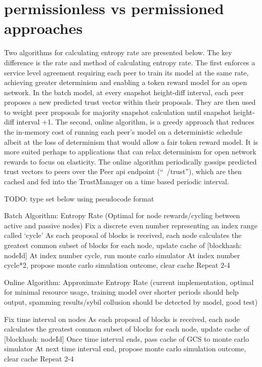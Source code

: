 \documentclass{article}
\begin{document}
\section {permissionless vs permissioned approaches}
Two algorithms for calculating entropy rate are presented below. The key difference is the rate and method of calculating entropy rate. The first enforces a service level agreement requiring each peer to train its model at the same rate, achieving greater determinism and enabling a token reward model for an open network. In the batch model, at every snapshot height-diff interval, each peer proposes a new predicted trust vector within their proposals. They are then used to weight peer proposals for majority snapshot calculation until snapshot height-diff interval +1.
The second, online algorithm, is a greedy approach that reduces the in-memory cost of running each peer’s model on a deterministic schedule albeit at the loss of determinism that would allow a fair token reward model. It is more suited perhaps to applications that can relax determinism for  open network rewards to focus on elasticity. The online algorithm periodically gossips predicted trust vectors to peers over the Peer api endpoint (“~/trust”), which are then cached and fed into the TrustManager on a time based periodic interval.


TODO: type set below using pseudocode format

Batch Algorithm: Entropy Rate (Optimal for node rewards/cycling between active and passive nodes)
Fix a discrete even number representing an index range called ‘cycle’
As each proposal of blocks is received, each node calculates the greatest common subset of blocks for each node, update cache of [blockhash: nodeId]
At index number cycle, run monte carlo simulator 
At index number cycle*2, propose monte carlo simulation outcome, clear cache
Repeat 2-4

Online Algorithm: Approximate Entropy Rate (current implementation, optimal for minimal resource usage, training model over shorter periods should help output, spamming results/sybil collusion should be detected by model, good test)

Fix time interval on nodes 
As each proposal of blocks is received, each node calculates the greatest common subset of blocks for each node, update cache of [blockhash: nodeId]
Once time interval ends, pass cache of GCS to monte carlo simulator 
At next time interval end, propose monte carlo simulation outcome, clear cache
Repeat 2-4
\end{document}

